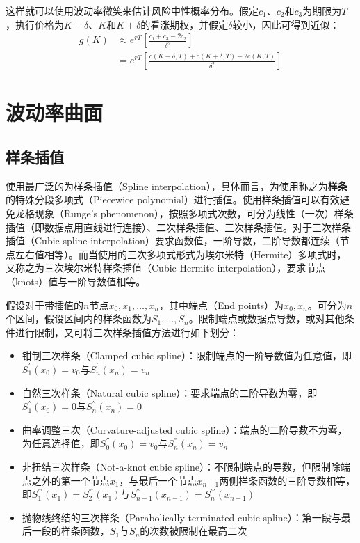 \documentclass[11pt]{article}
\begin{document}
这样就可以使用波动率微笑来估计风险中性概率分布。假定$c_1$、$c_2$和$c_3$为期限为$T$，执行价格为$K-\delta$、$K$和$K+\delta$的看涨期权，并假定$\delta$较小，因此可得到近似：
\begin{align*}
    g(K) &\approx e^{rT} \left[ \frac{c_1+c_3-2c_2}{\delta^2} \right] \\
    &= e^{rT} \left[ \frac{c(K-\delta,T)+c(K+\delta,T)-2c(K,T)}{\delta^2} \right]
\end{align*}

\section{波动率曲面}

\subsection{样条插值}

使用最广泛的为样条插值（Spline interpolation），具体而言，为使用称之为\textbf{样条}的特殊分段多项式（Piecewice polynomial）进行插值。使用样条插值可以有效避免龙格现象（Runge's phenomenon），按照多项式次数，可分为线性（一次）样条插值（即数据点用直线进行连接）、二次样条插值、三次样条插值。对于三次样条插值（Cubic spline interpolation）要求函数值，一阶导数，二阶导数都连续（节点左右值相等）。而当使用的三次多项式形式为埃尔米特（Hermite）多项式时，又称之为三次埃尔米特样条插值（Cubic Hermite interpolation），要求节点（knots）值与一阶导数值相等。

假设对于带插值的$n$节点$x_0,x_1,\dots,x_n$，其中端点（End points）为$x_0,x_n$。可分为$n$个区间，假设区间内的样条函数为$S_1,\dots,S_n$。限制端点或数据点导数，或对其他条件进行限制，又可将三次样条插值方法进行如下划分：
\begin{itemize}
    \item 钳制三次样条（Clamped cubic spline）：限制端点的一阶导数值为任意值，即$S_{1}^{'}(x_0)=v_0$与$S_{n}^{'}(x_{n})=v_n$
    \item 自然三次样条（Natural cubic spline）：要求端点的二阶导数为零，即$S_{1}^{''}(x_0)=0$与$S_{n}^{''}(x_{n})=0$
    \item 曲率调整三次（Curvature-adjusted cubic spline）：端点的二阶导数不为零，为任意选择值，即$S_{0}^{''}(x_0)=v_0$与$S_{n}^{''}(x_{n})=v_n$
    \item 非扭结三次样条（Not-a-knot cubic spline）：不限制端点的导数，但限制除端点之外的第一个节点$x_1$，与最后一个节点$x_{n-1}$两侧样条函数的三阶导数相等，即$S_{1}^{'''}(x_1) = S_{2}^{'''}(x_{1})$与$S_{n-1}^{'''}(x_{n-1}) = S_{n}^{'''}(x_{n-1})$
    \item 抛物线终结的三次样条（Parabolically terminated cubic spline）：第一段与最后一段的样条函数，$S_1$与$S_n$的次数被限制在最高二次
\end{itemize}
\end{document}
